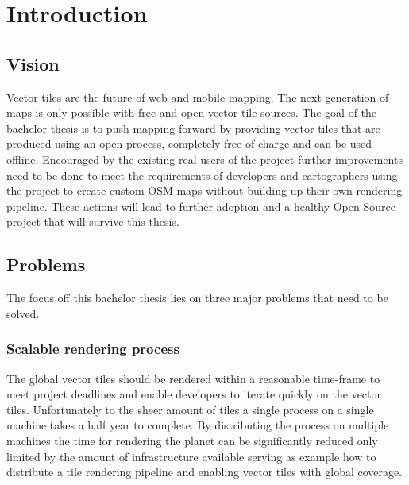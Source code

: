 \chapter{Introduction}




\section{Vision}\label{part1_vision}

Vector tiles are the future of web and mobile mapping. The next generation of maps is only possible
with free and open vector tile sources. The goal of the bachelor thesis is to push mapping forward by providing
vector tiles that are produced using an open process, completely free of charge and can be used offline.
Encouraged by the existing real users of the project further improvements need to be done to meet the requirements of developers and cartographers using the project to create custom OSM maps without building up their own rendering pipeline. These actions will lead to further adoption and a healthy Open Source project that will survive this thesis.


\section{Problems}\label{goals}

The focus off this bachelor thesis lies on three major problems that need to be solved.


\subsection{Scalable rendering process}\label{scalable-rendering-process}

The global vector tiles should be rendered within a reasonable time-frame
to meet project deadlines and enable developers to iterate quickly on the vector tiles.
Unfortunately to the sheer amount of tiles a single process on a single machine takes a half year to complete.
By distributing the process on multiple machines the time for rendering the planet can be significantly reduced only limited
by the amount of infrastructure available serving as example how to distribute a tile rendering pipeline and enabling
vector tiles with global coverage.

